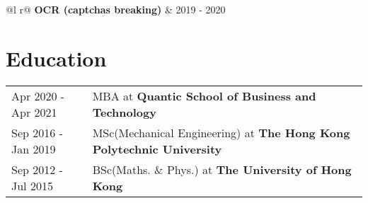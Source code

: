 \documentclass[a4paper,12pt]{article}
\begin{document}
\begin{tabularx}{\linewidth}{ @{}l r@{} }
\textbf{OCR (captchas breaking)} & \hfill 2019 - 2020 \\[3.75pt]
\end{tabularx}

\section{Education}
\begin{tabularx}{\linewidth}{@{}l X@{}}	
Apr 2020 - Apr 2021 & MBA at  \textbf{Quantic School of Business and Technology} \\

Sep 2016 - Jan 2019 & MSc(Mechanical Engineering) at \textbf{The Hong Kong Polytechnic University} \\ 

Sep 2012 - Jul 2015 & BSc(Maths. \& Phys.) at \textbf{The University of Hong Kong} \\

\end{tabularx}
\end{document}
